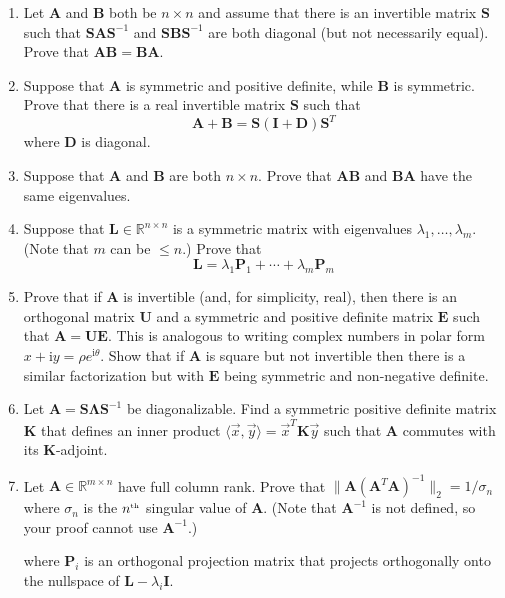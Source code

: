 \documentclass[11pt,fleqn]{article}
\newcommand{\mat}[1]{\mathbf{#1}}
\newcommand{\imag}{\mathrm{i}}
\begin{document}
\begin{enumerate}
\item Let $\mathbf{A}$ and $\mathbf{B}$ both be $n\times n$ and assume that there is an invertible matrix $\mathbf{S}$ such that $\mathbf{SAS}^{-1}$ and  $\mathbf{SBS}^{-1}$ are both diagonal (but not necessarily equal). Prove that $\mathbf{AB} = \mathbf{BA}$.

\item Suppose that $\mathbf{A}$ is symmetric and positive definite, while $\mathbf{B}$ is symmetric. Prove that there is a real invertible matrix $\mathbf{S}$ such that
\[\mathbf{A} + \mathbf{B} = \mathbf{S}\left(\mathbf{I} + \mathbf{D}\right)\mathbf{S}^T\]
where $\mathbf{D}$ is diagonal.

\item Suppose that $\mathbf{A}$ and $\mathbf{B}$ are both $n\times n$. Prove that $\mathbf{AB}$ and $\mathbf{BA}$ have the same eigenvalues. %

\item Suppose that $\mathbf{L}\in\mathbb{R}^{n\times n}$ is a symmetric matrix with eigenvalues $\lambda_1,\ldots,\lambda_m$. (Note that $m$ can be $\le n$.) Prove that
\[\mathbf{L} = \lambda_1 \mathbf{P}_1 + \cdots+\lambda_m\mathbf{P}_m\]

\item Prove that if $\mathbf{A}$ is invertible (and, for simplicity, real), then there is an orthogonal matrix $\mathbf{U}$ and a symmetric and positive definite matrix $\mathbf{E}$ such that $\mathbf{A} = \mathbf{UE}$. This is analogous to writing complex numbers in polar form $x+\imag y = \rho e^{\imag \theta}$. Show that if $\mathbf{A}$ is square but not invertible then there is a similar factorization but with $\mathbf{E}$ being symmetric and non-negative definite.

\item Let $\mathbf{A} = \mathbf{S\Lambda S}^{-1}$ be diagonalizable. Find a symmetric positive definite matrix $\mathbf{K}$ that defines an inner product $\langle\vec{x},\vec{y}\rangle =\vec{x}^T\mat{K}\vec{y}$ such that $\mathbf{A}$ commutes with its $\mat{K}$-adjoint.

\item Let $\mat{A}\in\mathbb{R}^{m\times n}$ have full column rank. Prove that $\|\mat{A}(\mat{A}^T\mat{A})^{-1}\|_2=1/\sigma_n$ where $\sigma_n$ is the $n^{\mbox{\tiny th}}$ singular value of $\mat{A}$. (Note that $\mat{A}^{-1}$ is not defined, so your proof cannot use $\mat{A}^{-1}$.)

where $\mathbf{P}_i$ is an orthogonal projection matrix that projects orthogonally onto the nullspace of $\mathbf{L} - \lambda_i\mathbf{I}$.
\end{enumerate}
 
\end{document}

